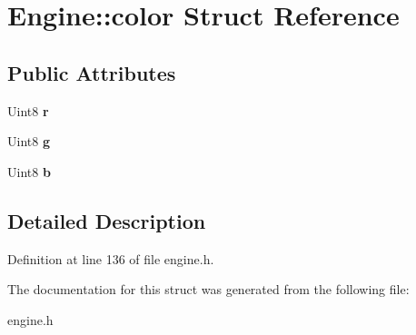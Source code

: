 \hypertarget{structEngine_1_1color}{}\section{Engine\+:\+:color Struct Reference}
\label{structEngine_1_1color}
\subsection*{Public Attributes}
\begin{DoxyCompactItemize}
\item 
Uint8 {\bfseries r}\hypertarget{structEngine_1_1color_ad2f4cb4cb1d9b251100bd1a4ebfa6b1e}{}\label{structEngine_1_1color_ad2f4cb4cb1d9b251100bd1a4ebfa6b1e}

\item 
Uint8 {\bfseries g}\hypertarget{structEngine_1_1color_a3e4b52509fd71e8551d297cd87073af4}{}\label{structEngine_1_1color_a3e4b52509fd71e8551d297cd87073af4}

\item 
Uint8 {\bfseries b}\hypertarget{structEngine_1_1color_a2c684bfdca0608a79500f714671b97e9}{}\label{structEngine_1_1color_a2c684bfdca0608a79500f714671b97e9}

\end{DoxyCompactItemize}


\subsection{Detailed Description}


Definition at line 136 of file engine.\+h.



The documentation for this struct was generated from the following file\+:\begin{DoxyCompactItemize}
\item 
engine.\+h\end{DoxyCompactItemize}
